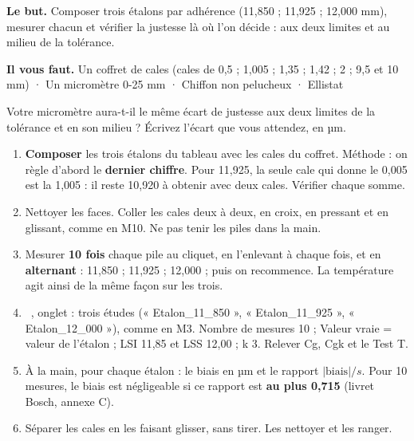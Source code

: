 \documentclass[10pt,a4paper]{article}
\begin{document}
\thispagestyle{fancy}
\begin{tcolorbox}[boite]\textbf{Le but.} Composer trois étalons par adhérence (11,850 ; 11,925 ; 12,000 mm), mesurer chacun et vérifier la justesse là où l'on décide : aux deux limites et au milieu de la tolérance.\par\textbf{Il vous faut.} Un coffret de cales (cales de 0,5 ; 1,005 ; 1,35 ; 1,42 ; 2 ; 9,5 et 10 mm) · Un micromètre 0-25 mm · Chiffon non pelucheux · Ellistat\end{tcolorbox}
\begin{tcolorbox}[pred]Votre micromètre aura-t-il le même écart de justesse aux deux limites de la tolérance et en son milieu ? Écrivez l'écart que vous attendez, en µm.\reponse\end{tcolorbox}
\begin{enumerate}[label=\textcolor{cyan}{\textbf{\arabic*.}},leftmargin=15pt,itemsep=1.5pt]
\item \textbf{Composer} les trois étalons du tableau avec les cales du coffret. Méthode : on règle d'abord le \textbf{dernier chiffre}. Pour 11,925, la seule cale qui donne le 0,005 est la 1,005 : il reste 10,920 à obtenir avec deux cales. Vérifier chaque somme.
\item Nettoyer les faces. Coller les cales deux à deux, en croix, en pressant et en glissant, comme en M10. Ne pas tenir les piles dans la main.
\item Mesurer \textbf{10 fois} chaque pile au cliquet, en l'enlevant à chaque fois, et en \textbf{alternant} : 11,850 ; 11,925 ; 12,000 ; puis on recommence. La température agit ainsi de la même façon sur les trois.
\item \tagE\ , onglet  : trois études (« Etalon\_11\_850 », « Etalon\_11\_925 », « Etalon\_12\_000 »), comme en M3. Nombre de mesures 10 ; Valeur vraie = valeur de l'étalon ; LSI 11,85 et LSS 12,00 ; k 3. Relever Cg, Cgk et le Test T.
\item À la main, pour chaque étalon : le biais en µm et le rapport $|\text{biais}| / s$. Pour 10 mesures, le biais est négligeable si ce rapport est \textbf{au plus 0,715} (livret Bosch, annexe C).
\item Séparer les cales en les faisant glisser, sans tirer. Les nettoyer et les ranger.
\end{enumerate}
\par\vspace{5pt}
\end{document}
